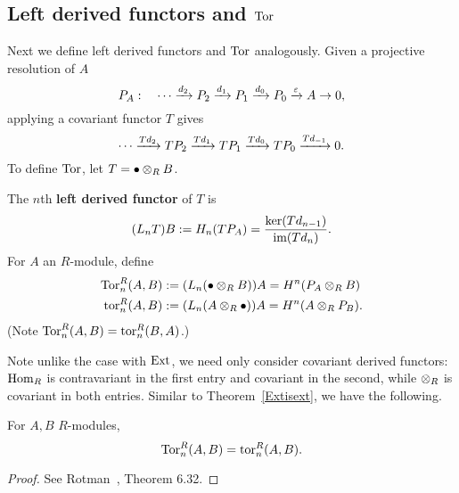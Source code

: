 \subsection{Left derived functors and $\operatorname{Tor}$}
Next we define left derived functors and $\operatorname{Tor}$ analogously. Given a projective resolution of $A$
\[
P_A:\quad \cdots \xrightarrow{d_2} P_2\xrightarrow{d_1}P_1\xrightarrow{d_0}P_0 \xrightarrow{\varepsilon} A\to 0,
\]
applying a covariant functor $T$ gives
\[
 \cdots \xra{Td_2} TP_2\xra{Td_1}TP_1\xra{Td_0}TP_0 %
\xra{Td_{-1}} 0.
\]
To define $\operatorname{Tor}$, let $T=\bullet \otimes_R B$.
\begin{df}
The $n$th \textbf{left derived functor} of $T$ is
\[
(L_nT)B:=H_n(TP_A)=\frac{\ker(Td_{n-1})}{\text{im}(Td_{n})}.
\]
For $A$ an $R$-module, define
\begin{align*}
\operatorname{Tor}^R_n(A,B)&:=(L_n (\bullet \otimes_R B))A=H^n(P_A\otimes_R B)\\
\operatorname{tor}^R_n(A,B)&:=(L_n (A\otimes_R \bullet))A=H^n(A\otimes_R P_B).
\end{align*}
(Note $\operatorname{Tor}^R_n(A,B)=\operatorname{tor}^R_n(B,A)$.)
\end{df}
Note unlike the case with $\operatorname{Ext}$, we need only consider covariant derived functors: $\operatorname{Hom}_R$ is contravariant in the first entry and covariant in the second, while $\otimes_R$ is covariant in both entries. Similar to Theorem~\ref{Extisext}, we have the following.
\begin{thm}
For $A,B$ $R$-modules,
\[
\operatorname{Tor}^R_n(A,B)=\operatorname{tor}^R_n(A,B).
\]
\end{thm}
\begin{proof}
See Rotman~\cite{Ro09}, Theorem 6.32.
\end{proof}
